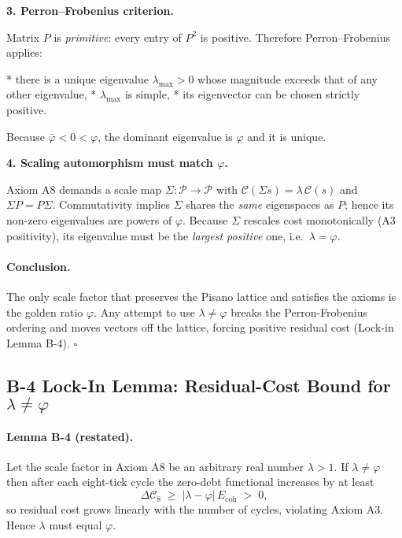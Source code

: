 \documentclass[11pt]{article}
\begin{document}
\bigskip
\textbf{3. Perron–Frobenius criterion.}

Matrix $P$ is \emph{primitive}: every entry of $P^2$ is positive.  
Therefore Perron–Frobenius applies:

* there is a unique eigenvalue $\lambda_{\max}>0$
  whose magnitude exceeds that of any other eigenvalue,  
* $\lambda_{\max}$ is simple,  
* its eigenvector can be chosen strictly positive.

Because $\bar\varphi<0<\varphi$, the dominant eigenvalue is $\varphi$ and it is unique.

\bigskip
\textbf{4. Scaling automorphism must match $\varphi$.}

Axiom A8 demands a scale map  
$\Sigma:\mathcal P\to\mathcal P$ with
$\mathcal C(\Sigma s)=\lambda\,\mathcal C(s)$ and
$\Sigma P = P\Sigma.$  
Commutativity implies $\Sigma$ shares the \emph{same} eigenspaces as $P$;
hence its non-zero eigenvalues are powers of $\varphi$.  
Because $\Sigma$ rescales cost monotonically (A3 positivity), its
eigenvalue must be the \emph{largest positive} one, i.e.\ \(\lambda=\varphi\).

\bigskip
\paragraph{Conclusion.}
The only scale factor that preserves the Pisano lattice and satisfies
the axioms is the golden ratio \(\boxed{\varphi}\).
Any attempt to use $\lambda\neq\varphi$ breaks the Perron-Frobenius
ordering and moves vectors off the lattice, forcing positive residual
cost (Lock-in Lemma B-4). \(\square\)

\subsection*{B-4 Lock-In Lemma: Residual-Cost Bound for \texorpdfstring{$\lambda\neq\varphi$}{λ≠φ}}
\label{app:lock-in}

\paragraph{Lemma B-4 (restated).}
Let the scale factor in Axiom A8 be an arbitrary real number
$\lambda>1$.  
If $\lambda\neq\varphi$ then after each eight-tick cycle the zero-debt
functional increases by at least
\[
\Delta\mathcal C_8
\;\ge\;
\bigl|\lambda-\varphi\bigr|\,E_{\text{coh}}
\;>\;0,
\]
so residual cost grows linearly with the number of cycles, violating
Axiom A3.  Hence $\lambda$ must equal $\varphi$.
\end{document}
